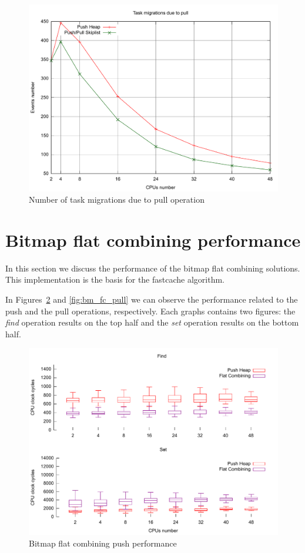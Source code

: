 \begin{figure}[htbp]
    \includegraphics[width=\columnwidth]{images/cpudl_pull_nr_pulled_here}
    \caption{Number of task migrations due to pull operation}
    \label{fig:cpudl_pull_nr_pulled_here}
\end{figure}

\section{Bitmap flat combining performance\label{sec:bm_fc_perf}}

In this section we discuss the performance of
the bitmap flat combining solutions. This implementation is the basis
for the fastcache algorithm.

In Figures~\ref{fig:bm_fc_push} and \ref{fig:bm_fc_pull} we can observe 
the performance related to the push and the pull operations, respectively.
Each graphs contains two figures: the \emph{find} operation 
results on the top half and the \emph{set} operation results
on the bottom half.

\begin{figure}[htbp]
    \includegraphics[width=\columnwidth]{images/bm_fc_push}
    \caption{Bitmap flat combining push performance}
    \label{fig:bm_fc_push}
\end{figure}

